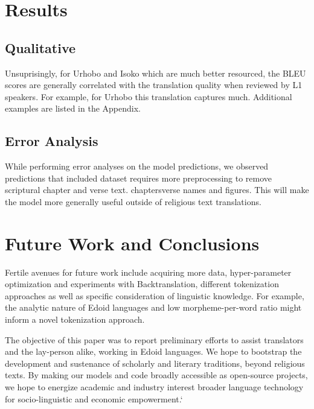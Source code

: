 \documentclass{article} %
\begin{document}
\section{Results}
\label{results}



\subsection{Qualitative}

Unsuprisingly, for Urhobo and Isoko which are much better resourced, the BLEU scores are generally correlated with the translation quality when reviewed by L1 speakers. For example, for Urhobo this translation captures much. Additional examples are listed in the Appendix.

\subsection{Error Analysis}
While performing error analyses on the model predictions, we observed predictions that included  dataset requires more preprocessing to remove scriptural chapter and verse text.  chapters\/verse names and figures. This will make the model more generally useful outside of religious text translations.

\section{Future Work and Conclusions}
Fertile avenues for future work include acquiring more data, hyper-parameter optimization and experiments with Backtranslation, different tokenization approaches as well as specific consideration of linguistic knowledge. For example, the analytic nature of Edoid languages and low morpheme-per-word ratio might inform a novel tokenization approach.

 The objective of this paper was to report preliminary efforts to assist translators and the lay-person alike, working in Edoid languages. We hope to bootstrap the development and sustenance of scholarly and literary traditions, beyond religious texts. By making our models and code broadly accessible as open-source projects, we hope to energize academic and industry interest broader language technology for socio-linguistic and economic empowerment.`
 
% 
\end{document}
